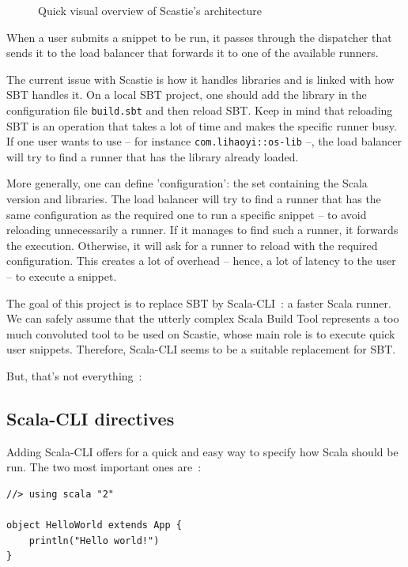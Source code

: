\documentclass{article}
\begin{document}
\begin{figure}[H]
    \centering
    
    \label{fig:scastie_architecture}
    \caption{Quick visual overview of Scastie's architecture}
\end{figure}

When a user submits a snippet to be run, it passes through the dispatcher that sends it to the load balancer that forwards it to one of the
available runners.

The current issue with Scastie is how it handles libraries and is linked with how SBT handles it.
On a local SBT project, one should add the library in the configuration file \lstinline{build.sbt} and then reload SBT.
Keep in mind that reloading SBT is an operation that takes a lot of time and makes the specific runner busy.
If one user wants to use -- for instance \lstinline{com.lihaoyi::os-lib} --, the load balancer will try to find a runner that has
the library already loaded.

More generally, one can define 'configuration': the set containing the Scala version and libraries. The load balancer will try to find a
runner that has the same configuration as the required one to run a specific snippet -- to avoid reloading unnecessarily a runner.
If it manages to find such a runner, it forwards the execution. Otherwise, it will ask for a runner to reload with the
required configuration. This creates a lot of overhead -- hence, a lot of latency to the user -- to execute a snippet.

The goal of this project is to replace SBT by Scala-CLI~: a faster Scala runner. We can safely assume that the utterly complex Scala Build
Tool represents a too much convoluted tool to be used on Scastie, whose main role is to execute quick user snippets.
Therefore, Scala-CLI seems to be a suitable replacement for SBT.

But, that's not everything~:

\subsection{Scala-CLI directives}

Adding Scala-CLI offers for a quick and easy way to specify how Scala should be run. The two most important ones are~:

\begin{lstlisting}[style=sc]
//> using scala "2"

object HelloWorld extends App {
    println("Hello world!")
}
\end{lstlisting}
\end{document}
